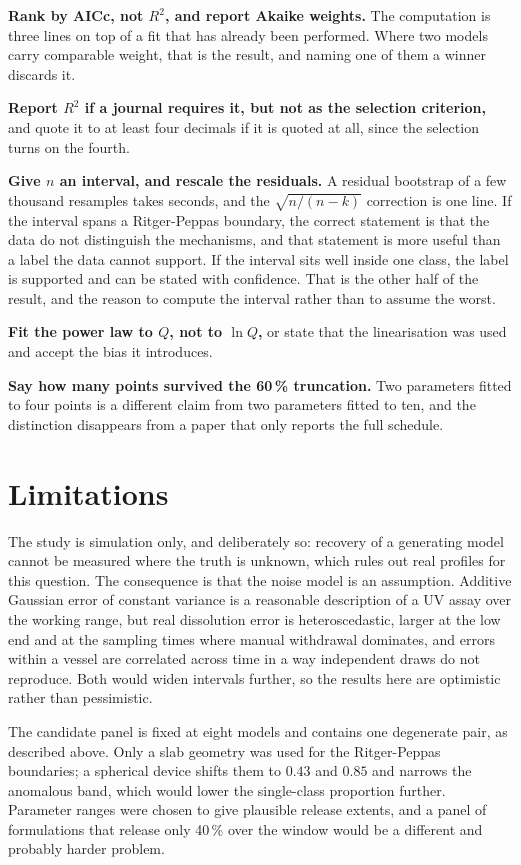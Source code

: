 \documentclass[11pt,a4paper]{article}
\begin{document}
\textbf{Rank by AICc, not $R^2$, and report Akaike weights.} The computation
is three lines on top of a fit that has already been performed. Where two
models carry comparable weight, that is the result, and naming one of them a
winner discards it.

\textbf{Report $R^2$ if a journal requires it, but not as the selection
criterion,} and quote it to at least four decimals if it is quoted at all,
since the selection turns on the fourth.

\textbf{Give $n$ an interval, and rescale the residuals.} A residual
bootstrap of a few thousand resamples takes seconds, and the
$\sqrt{n/(n-k)}$ correction is one line. If the interval spans a
Ritger-Peppas boundary, the correct statement is that the data do not
distinguish the mechanisms, and that statement is more useful than a label the
data cannot support. If the interval sits well inside one class, the label is
supported and can be stated with confidence. That is the other half of the
result, and the reason to compute the interval rather than to assume the worst.

\textbf{Fit the power law to $Q$, not to $\ln Q$,} or state that the
linearisation was used and accept the bias it introduces.

\textbf{Say how many points survived the 60\,\% truncation.} Two parameters
fitted to four points is a different claim from two parameters fitted to ten,
and the distinction disappears from a paper that only reports the full
schedule.

\section{Limitations}

The study is simulation only, and deliberately so: recovery of a generating
model cannot be measured where the truth is unknown, which rules out real
profiles for this question. The consequence is that the noise model is an
assumption. Additive Gaussian error of constant variance is a reasonable
description of a UV assay over the working range, but real dissolution error
is heteroscedastic, larger at the low end and at the sampling times where
manual withdrawal dominates, and errors within a vessel are correlated across
time in a way independent draws do not reproduce. Both would widen intervals
further, so the results here are optimistic rather than pessimistic.

The candidate panel is fixed at eight models and contains one degenerate pair,
as described above. Only a slab geometry was used for the Ritger-Peppas
boundaries; a spherical device shifts them to $0.43$ and $0.85$ and narrows
the anomalous band, which would lower the single-class proportion further.
Parameter ranges were chosen to give plausible release extents, and a panel of
formulations that release only 40\,\% over the window would be a different and
probably harder problem.
\end{document}
